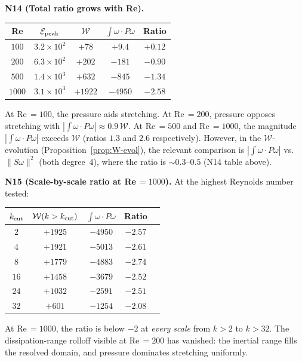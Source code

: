\documentclass[11pt,a4paper]{article}
\theoremstyle{plain}
\theoremstyle{definition}
\theoremstyle{remark}
\begin{document}
\textbf{N14 (Total ratio grows with Re).}
\begin{center}
\renewcommand{\arraystretch}{1.2}
\begin{tabular}{@{}ccccc@{}}
\toprule
Re & $\mathcal{E}_{\rm peak}$
  & $\mathcal{W}$ & $\int\omega\cdot P\omega$
  & Ratio \\
\midrule
$100$ & $3.2\!\times\!10^2$
  & $+78$ & $+9.4$ & $\mathbf{+0.12}$ \\
$200$ & $6.3\!\times\!10^2$
  & $+202$ & $-181$ & $\mathbf{-0.90}$ \\
$500$ & $1.4\!\times\!10^3$
  & $+632$ & $-845$ & $\mathbf{-1.34}$ \\
$1000$ & $3.1\!\times\!10^3$
  & $+1922$ & $-4950$ & $\mathbf{-2.58}$ \\
\bottomrule
\end{tabular}
\end{center}
At Re$\,=100$, the pressure aids stretching.
At Re$\,=200$, pressure opposes stretching with
$|\int\omega\cdot P\omega|\approx 0.9\,\mathcal{W}$.
At Re$\,=500$ and Re$\,=1000$, the magnitude
$|\int\omega\cdot P\omega|$ exceeds $\mathcal{W}$
(ratios $1.3$ and $2.6$ respectively).  However,
in the $\mathcal{W}$-evolution
(Proposition~\ref{prop:W-evol}), the relevant
comparison is $|\int\omega\cdot P\omega|$ vs.\
$\|S\omega\|^2$ (both degree~4), where the
ratio is $\sim 0.3$--$0.5$ (N14 table above).

\textbf{N15 (Scale-by-scale ratio at Re$\,=1000$).}
At the highest Reynolds number tested:
\begin{center}
\renewcommand{\arraystretch}{1.2}
\begin{tabular}{@{}ccccc@{}}
\toprule
$k_{\rm cut}$ & $\mathcal{W}(k>k_{\rm cut})$
  & $\int\omega\cdot P\omega$ & Ratio \\
\midrule
$2$ & $+1925$ & $-4950$ & $-2.57$ \\
$4$ & $+1921$ & $-5013$ & $-2.61$ \\
$8$ & $+1779$ & $-4883$ & $-2.74$ \\
$16$ & $+1458$ & $-3679$ & $-2.52$ \\
$24$ & $+1032$ & $-2591$ & $-2.51$ \\
$32$ & $+601$ & $-1254$ & $-2.08$ \\
\bottomrule
\end{tabular}
\end{center}
At Re$\,=1000$, the ratio is below $-2$ at
\emph{every scale} from $k>2$ to $k>32$.
The dissipation-range rolloff visible at
Re$\,=200$ has vanished: the inertial range
fills the resolved domain, and pressure
dominates stretching uniformly.
\end{document}
